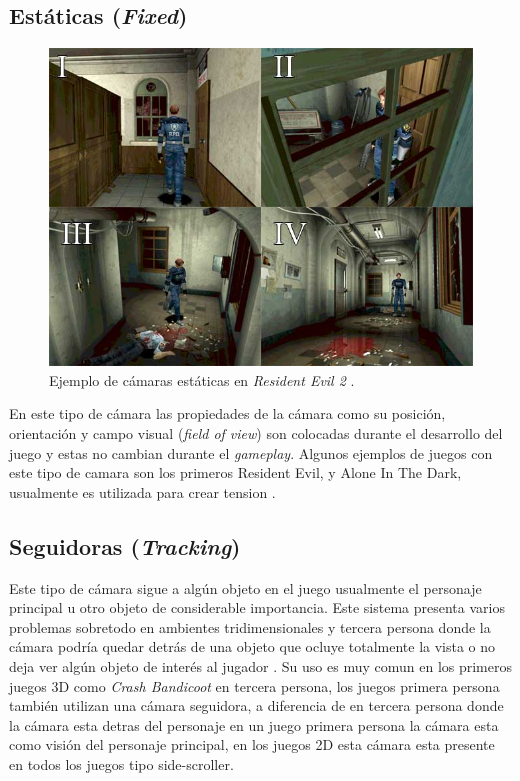 \subsection{Estáticas (\emph{Fixed})}
\begin{figure}
\includegraphics[width=\linewidth]{semana2/resident_evil_camerawork.jpg} 
\caption{Ejemplo de cámaras estáticas en \emph{Resident Evil 2} \cite{fixed_camera}.}
\end{figure}
En este tipo de cámara las propiedades de la cámara como su posición, orientación y campo visual (\emph{field of view}) son colocadas durante el desarrollo del juego y estas no cambian durante el \emph{gameplay}. Algunos ejemplos de juegos con este tipo de camara son los primeros Resident Evil, y Alone In The Dark, usualmente es utilizada para crear tension \cite{res5_review}\cite{fixed_camera}.
\subsection{Seguidoras (\emph{Tracking})}
Este tipo de cámara sigue a algún objeto en el juego usualmente el personaje principal u otro objeto de considerable importancia. Este sistema presenta varios problemas sobretodo en ambientes tridimensionales y tercera persona donde la cámara podría quedar detrás de una objeto que ocluye totalmente la vista o no deja ver algún objeto de interés al jugador \cite{fund_gamedesign}. Su uso es muy comun en los primeros juegos 3D como \emph{Crash Bandicoot} en tercera persona, los juegos primera persona también utilizan una cámara seguidora, a diferencia de en tercera persona donde la cámara esta detras del personaje en un juego primera persona la cámara esta como visión del personaje principal, en los juegos 2D esta cámara esta presente en todos los juegos tipo side-scroller.
\newpage
